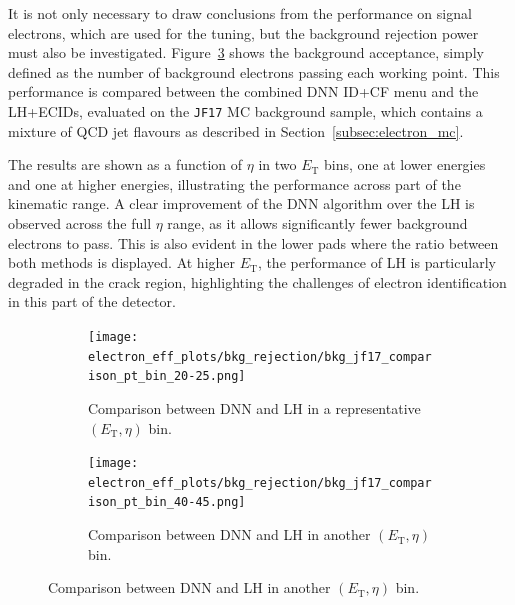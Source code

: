 
It is not only necessary to draw conclusions from the performance on signal electrons, which are used for the tuning, but the background rejection power must also be investigated. Figure~\ref{fig:bkg_acceptance_mc} shows the background acceptance, simply defined as the number of background electrons passing each working point. This performance is compared between the combined DNN ID+CF menu and the LH+ECIDs, evaluated on the \texttt{JF17} MC background sample, which contains a mixture of QCD jet flavours as described in Section~\ref{subsec:electron_mc}. 

The results are shown as a function of $\eta$ in two $E_{\mathrm{T}}$ bins, one at lower energies and one at higher energies, illustrating the performance across part of the kinematic range. A clear improvement of the DNN algorithm over the LH is observed across the full $\eta$ range, as it allows significantly fewer background electrons to pass. This is also evident in the lower pads where the ratio between both methods is displayed. At higher $E_{\mathrm{T}}$, the performance of LH is particularly degraded in the crack region, highlighting the challenges of electron identification in this part of the detector.

\begin{figure}[htbp]
  \centering
  \begin{subfigure}{0.48\textwidth}
    \centering
    \texttt{[image: electron\_eff\_plots/bkg\_rejection/bkg\_jf17\_comparison\_pt\_bin\_20-25.png]}
    \caption{Comparison between DNN and LH in a representative $(E_{\mathrm{T}},\eta)$ bin.}
    \label{fig:bkg_acceptance_jf17_20_25}
  \end{subfigure}
  \hfill
  \begin{subfigure}{0.48\textwidth}
    \centering
    \texttt{[image: electron\_eff\_plots/bkg\_rejection/bkg\_jf17\_comparison\_pt\_bin\_40-45.png]}
    \caption{Comparison between DNN and LH in another $(E_{\mathrm{T}},\eta)$ bin.}
    \label{fig:bkg_acceptance_jf17_40_45}
  \end{subfigure}
  \label{fig:bkg_acceptance_mc}
\end{figure}


